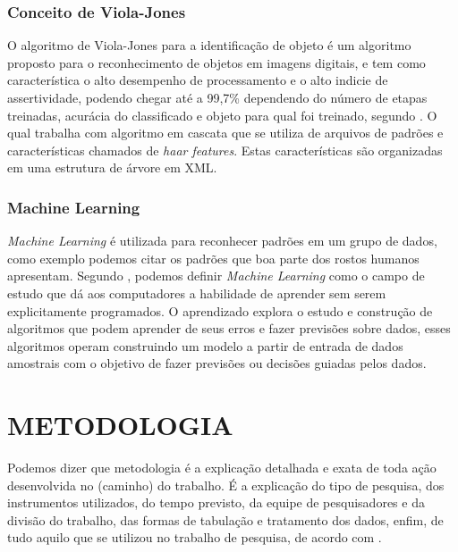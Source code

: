 \subsection{Conceito de Viola-Jones}


O algoritmo de Viola-Jones para a identificação de objeto é um algoritmo proposto para o reconhecimento de objetos em imagens digitais, e tem como característica o alto desempenho de processamento e o alto indicie de assertividade, podendo chegar até a 99,7\% dependendo do número de etapas treinadas, acurácia do classificado e objeto para qual foi treinado, segundo . O qual trabalha com algoritmo em cascata que se utiliza de arquivos de padrões e características chamados de \textit{haar features}. Estas características são organizadas em uma estrutura de árvore em XML.

\subsection{Machine Learning}

\textit{Machine Learning} é utilizada para reconhecer padrões em um grupo de dados, como exemplo podemos citar os padrões que boa parte dos rostos humanos apresentam. Segundo , podemos definir \textit{Machine Learning} como o campo de estudo que dá aos computadores a habilidade de aprender sem serem explicitamente programados. O aprendizado explora o estudo e construção de algoritmos que podem aprender de seus erros e fazer previsões sobre dados, esses algoritmos operam construindo um modelo a partir de entrada de dados amostrais com o objetivo de fazer previsões ou decisões guiadas pelos dados.

\chapter{METODOLOGIA}\label{CAP3}

Podemos dizer que metodologia é a explicação detalhada e exata de toda ação desenvolvida no (caminho) do trabalho. É a explicação do tipo de pesquisa, dos instrumentos utilizados, do tempo previsto, da equipe de pesquisadores e da divisão do trabalho, das formas de tabulação e tratamento dos dados, enfim, de tudo aquilo que se utilizou no trabalho de pesquisa, de acordo com .

